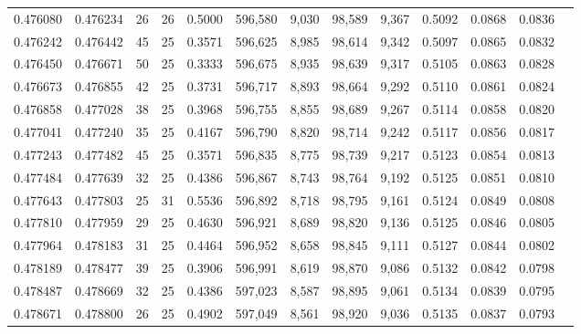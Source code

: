 \begin{tabular}{rrrrrrrrrrrrr}
0.476080 & 0.476234 &    26 &  26 &                                     0.5000 & 596,580 &   9,030 &  98,589 &   9,367 & 0.5092 & 0.0868 & 0.0836 \\
0.476242 & 0.476442 &    45 &  25 &                                     0.3571 & 596,625 &   8,985 &  98,614 &   9,342 & 0.5097 & 0.0865 & 0.0832 \\
0.476450 & 0.476671 &    50 &  25 &                                     0.3333 & 596,675 &   8,935 &  98,639 &   9,317 & 0.5105 & 0.0863 & 0.0828 \\
0.476673 & 0.476855 &    42 &  25 &                                     0.3731 & 596,717 &   8,893 &  98,664 &   9,292 & 0.5110 & 0.0861 & 0.0824 \\
0.476858 & 0.477028 &    38 &  25 &                                     0.3968 & 596,755 &   8,855 &  98,689 &   9,267 & 0.5114 & 0.0858 & 0.0820 \\
0.477041 & 0.477240 &    35 &  25 &                                     0.4167 & 596,790 &   8,820 &  98,714 &   9,242 & 0.5117 & 0.0856 & 0.0817 \\
0.477243 & 0.477482 &    45 &  25 &                                     0.3571 & 596,835 &   8,775 &  98,739 &   9,217 & 0.5123 & 0.0854 & 0.0813 \\
0.477484 & 0.477639 &    32 &  25 &                                     0.4386 & 596,867 &   8,743 &  98,764 &   9,192 & 0.5125 & 0.0851 & 0.0810 \\
0.477643 & 0.477803 &    25 &  31 &                                     0.5536 & 596,892 &   8,718 &  98,795 &   9,161 & 0.5124 & 0.0849 & 0.0808 \\
0.477810 & 0.477959 &    29 &  25 &                                     0.4630 & 596,921 &   8,689 &  98,820 &   9,136 & 0.5125 & 0.0846 & 0.0805 \\
0.477964 & 0.478183 &    31 &  25 &                                     0.4464 & 596,952 &   8,658 &  98,845 &   9,111 & 0.5127 & 0.0844 & 0.0802 \\
0.478189 & 0.478477 &    39 &  25 &                                     0.3906 & 596,991 &   8,619 &  98,870 &   9,086 & 0.5132 & 0.0842 & 0.0798 \\
0.478487 & 0.478669 &    32 &  25 &                                     0.4386 & 597,023 &   8,587 &  98,895 &   9,061 & 0.5134 & 0.0839 & 0.0795 \\
0.478671 & 0.478800 &    26 &  25 &                                     0.4902 & 597,049 &   8,561 &  98,920 &   9,036 & 0.5135 & 0.0837 & 0.0793 \\

\end{tabular}
